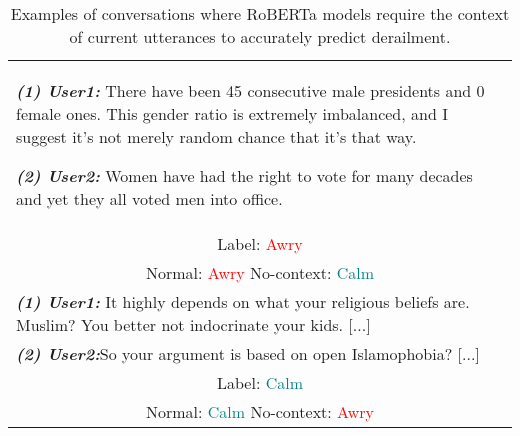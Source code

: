 \begin{table}[ht]
    \renewcommand{\arraystretch}{1.0}
        \begin{tabularx}{\linewidth}{|X|}
            \hline
            \textbf{\textit{(1) User1:}} There have been 45 consecutive male presidents and 0 female ones. This gender ratio is extremely imbalanced, and I suggest it's not merely random chance that it's that way.
    
            \textbf{\textit{(2) User2:}} Women have had the right to vote for many decades and yet they all voted men into office. 
            \\
            \multicolumn{1}{|c|}{Label: \textcolor{red}{Awry}} \\
            \multicolumn{1}{|c|}{Normal: \textcolor{red}{Awry}\quad        
            No-context: \textcolor{teal}{Calm}}\\
            
            \hline
    
           \textbf{\textit{(1) User1:}} It highly depends on what your religious beliefs are. Muslim? You better not indocrinate your kids.  [...]
           \\
            \textbf{\textit{(2) User2:}}So your argument is based on open Islamophobia?   [...]
            \\
            \multicolumn{1}{|c|}{Label: \textcolor{teal}{Calm}}
            \\ \multicolumn{1}{|c|}{Normal: \textcolor{teal}{Calm}\quad
            No-context: \textcolor{red}{Awry}}
            \\
            
            \hline
    
        \end{tabularx}
    
    \caption{Examples of conversations where RoBERTa models require the context of current utterances to accurately predict derailment.}
    \label{tab:intersection-example}
    \end{table}
